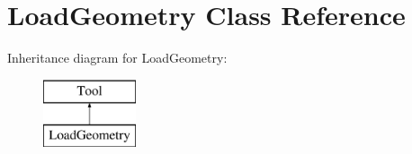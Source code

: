 \hypertarget{classLoadGeometry}{\section{Load\-Geometry Class Reference}
\label{classLoadGeometry}
}
Inheritance diagram for Load\-Geometry\-:\begin{figure}[H]
\begin{center}
\leavevmode
\includegraphics[height=2.000000cm]{classLoadGeometry}
\end{center}
\end{figure}
